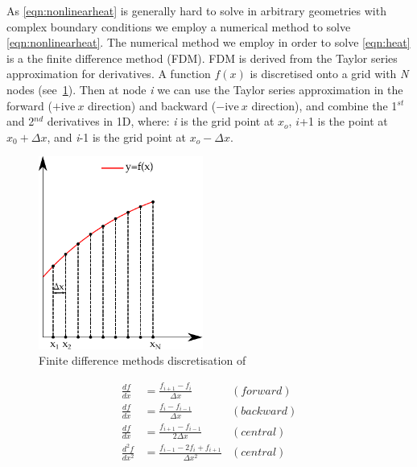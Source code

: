 As \cref{eqn:nonlinearheat} is generally hard to solve in arbitrary geometries with complex boundary conditions we employ a numerical method to solve \cref{eqn:nonlinearheat}.
The numerical method we employ in order to solve \cref{eqn:heat} is a the finite difference method (FDM)\cite{ozisik1994finite}. FDM is derived from the Taylor series approximation for derivatives. A function $f(x)$ is discretised onto a grid with \textit{N} nodes (see~\cref{fig:fdmexplain}). Then at node \textit{i} we can use the Taylor series approximation in the forward ($+\text{ive}\ x$ direction) and backward ($-\text{ive}\ x$ direction), and combine the 1$^{st}$ and 2$^{nd}$ derivatives in 1D, where: \textit{i} is the grid point at $x_o$, $i$+1 is the point at $x_0+\Delta x$, and \textit{i}-1 is the grid point at $x_{o}-\Delta x$.

\begin{figure}
  \begin{center}
    \includegraphics[width=0.48\textwidth]{./ablation/images/fdm.pdf}
  \end{center}
  \caption{Finite difference methods discretisation of }\label{fig:fdmexplain}
    \vspace{-20pt}
\end{figure}

\begin{subequations}
\begin{align}
\frac{df}{dx} &= \frac{f_{i+1} - f_{i}}{\Delta x}  &(forward)\\
\frac{df}{dx} &= \frac{f_{i} - f_{i-1}}{\Delta x}  &(backward)\\
\frac{df}{dx} &= \frac{f_{i+1} - f_{i-1}}{2\Delta x}  &(central)\\
\frac{d^2f}{dx^2} &= \frac{f_{i-1}-2f_i+f_{i+1}}{\Delta x^2} &(central)
\end{align}
\end{subequations}


